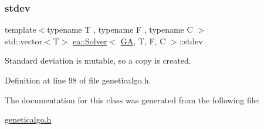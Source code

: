 \mbox{\label{classea_1_1_solver_3_01_g_a_00_01_t_00_01_f_00_01_c_01_4_a097a7ec4bbcf9e5bade6e498d55d4d11}} 
\subsubsection{\texorpdfstring{stdev}{stdev}}
{\footnotesize\ttfamily template$<$typename T , typename F , typename C $>$ \\
std\+::vector$<$T$>$ \hyperlink{classea_1_1_solver}{ea\+::\+Solver}$<$ \hyperlink{structea_1_1_g_a}{GA}, T, F, C $>$\+::stdev\hspace{0.3cm}{\ttfamily [private]}}



Standard deviation is mutable, so a copy is created. 



Definition at line 98 of file geneticalgo.\+h.



The documentation for this class was generated from the following file\+:\begin{DoxyCompactItemize}
\item 
\hyperlink{geneticalgo_8h}{geneticalgo.\+h}\end{DoxyCompactItemize}
